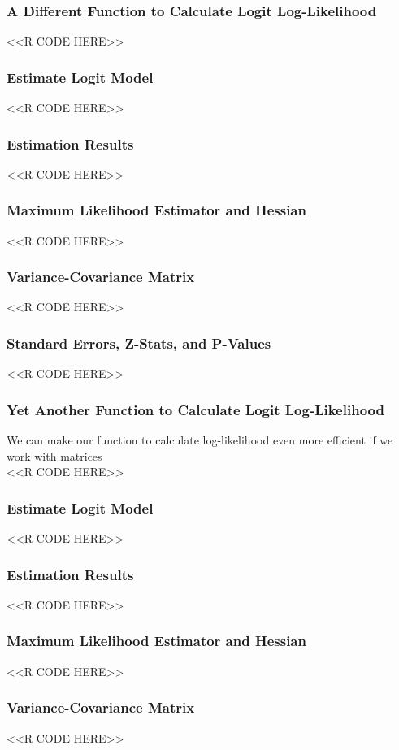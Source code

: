 \documentclass{beamer}
\begin{document}
\begin{frame}[fragile]\frametitle{A Different Function to Calculate Logit Log-Likelihood}
    <<R CODE HERE>>
\end{frame}

\begin{frame}[fragile]\frametitle{Estimate Logit Model}
    <<R CODE HERE>>
\end{frame}

\begin{frame}[fragile]\frametitle{Estimation Results}
    <<R CODE HERE>>
\end{frame}

\begin{frame}[fragile]\frametitle{Maximum Likelihood Estimator and Hessian}
    <<R CODE HERE>>
\end{frame}

\begin{frame}[fragile]\frametitle{Variance-Covariance Matrix}
    <<R CODE HERE>>
\end{frame}

\begin{frame}[fragile]\frametitle{Standard Errors, Z-Stats, and P-Values}
    <<R CODE HERE>>
\end{frame}

\begin{frame}[fragile]\frametitle{Yet Another Function to Calculate Logit Log-Likelihood}
	We can make our function to calculate log-likelihood even more efficient if we work with matrices \\
	\vspace{1ex}
    <<R CODE HERE>>
\end{frame}

\begin{frame}[fragile]\frametitle{Estimate Logit Model}
    <<R CODE HERE>>
\end{frame}

\begin{frame}[fragile]\frametitle{Estimation Results}
    <<R CODE HERE>>
\end{frame}

\begin{frame}[fragile]\frametitle{Maximum Likelihood Estimator and Hessian}
    <<R CODE HERE>>
\end{frame}

\begin{frame}[fragile]\frametitle{Variance-Covariance Matrix}
    <<R CODE HERE>>
\end{frame}
\end{document}
